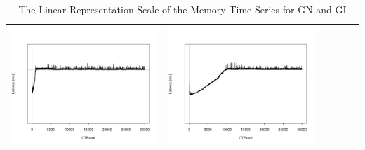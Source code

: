\begin{table}[htbp]
{\begin{tabular}{l | ccccc}
\begin{minipage}{.15\textwidth}
				\vspace{2pt}
     			 	\includegraphics[width=\linewidth]{images/lat-log-graph/I14}
    				 \end{minipage}
    			   &	 \begin{minipage}{.15\textwidth}
     			 	
				\vspace{2pt}
     			 	\includegraphics[width=\linewidth]{images/lat-log-graph/I15}
    				 \end{minipage}\\
		\hline %
	 \end{tabular}
	}
	\caption[\textsc{Analyser} Investigation Stack - Level 2 - Pattern Identification - Latency - Baselines GN and GI]{The Linear Representation Scale of the Memory Time Series for GN and GI} 
 	\label{tab:level2-latency-graph}
\end{table}